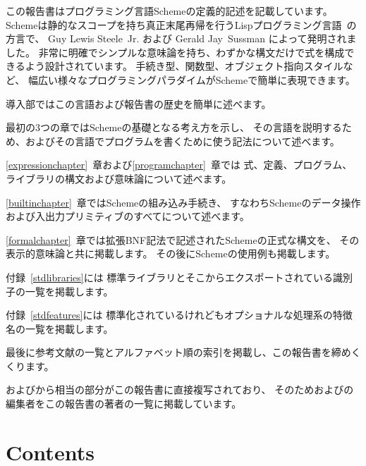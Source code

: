 この報告書はプログラミング言語Schemeの定義的記述を記載しています。
Schemeは静的なスコープを持ち真正末尾再帰を行うLispプログラミング言語~\cite{McCarthy}の方言で、
Guy Lewis Steele~Jr. および Gerald Jay~Sussman によって発明されました。
非常に明確でシンプルな意味論を持ち、わずかな構文だけで式を構成できるよう設計されています。
手続き型、関数型、オブジェクト指向スタイルなど、
幅広い様々なプログラミングパラダイムがSchemeで簡単に表現できます。

\vest 導入部ではこの言語および報告書の歴史を簡単に述べます。

\vest 最初の3つの章ではSchemeの基礎となる考え方を示し、
その言語を説明するため、およびその言語でプログラムを書くために使う記法について述べます。

\vest \ref{expressionchapter}~章および\ref{programchapter}~章では
式、定義、プログラム、ライブラリの構文および意味論について述べます。

\vest \ref{builtinchapter}~章ではSchemeの組み込み手続き、
すなわちSchemeのデータ操作および入出力プリミティブのすべてについて述べます。

\vest \ref{formalchapter}~章では拡張BNF記法で記述されたSchemeの正式な構文を、
その表示的意味論と共に掲載します。
その後にSchemeの使用例も掲載します。

\vest 付録~\ref{stdlibraries}には
標準ライブラリとそこからエクスポートされている識別子の一覧を掲載します。

\vest 付録~\ref{stdfeatures}には
標準化されているけれどもオプショナルな処理系の特徴名の一覧を掲載します。


\vest 最後に参考文献の一覧とアルファベット順の索引を掲載し、この報告書を締めくくります。

\begin{note}
\rfivers{}および\rsixrs{}から相当の部分がこの報告書に直接複写されており、
そのため\rfivers{}および\rsixrs{}の編集者をこの報告書の著者の一覧に掲載しています。
\end{note}


\vfill
\eject

\chapter*{Contents}
\addvspace{3.5pt}                  %
\renewcommand{\tocshrink}{-3.5pt}  %
{\footnotesize
\tableofcontents
}

\vfill
\eject
